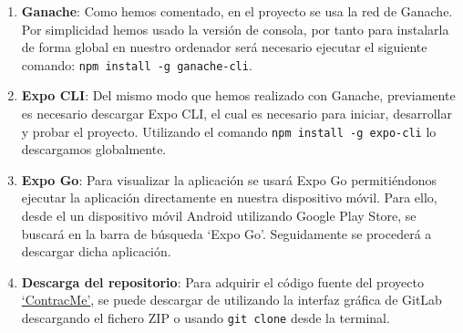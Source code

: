 \begin{enumerate}
\begin{figure}[h]
	\centering
	\texttt{[image: TruffleGanache]}
	\caption[Configuración Ganache Truffle]{Configuración red Ganache en truffle-config.js.}
	\label{fig:TruffleGanache}
\end{figure}

Dentro del archivo \texttt{truffle-config.js} también será necesario realizar la configuración de compiladores para especificar como los contratos inteligentes deben de ser compilados, optimizados y ejecutados en la máquina virtual de Ethereum.
Se deberá especificar la versión \textbf{0.8.20}, la cual usará Truffle para compilar los contratos, esta versión coincide con la versión que se ha usado de Solidity para desarrollar los contratos inteligentes.
Dentro de \textit{Settings} se ha de especificar algunas opciones que afectan a la compilación de los contratos. La opción \textit{optimizer} debe marcarse como \textit{true}, ayudándonos a reducir el código \textit{byte} de los contratos y hacerlos más eficientes en términos de gas.
Por otro lado, las \textit{runs} se deben de establecer en 200, un número más alto puede resultar en un código más optimizado en términos de gas, pero con un proceso de compilación más lento. ver imagen \ref{fig:TruffleCompiler}.

\begin{figure}[h]
	\centering
	\texttt{[image: TruffleCompiler]}
	\caption[Configuración compilador Truffle]{Configuración del compilador en truffle-config.js.}
	\label{fig:TruffleCompiler}
\end{figure}

\item \textbf{Ganache}: Como hemos comentado, en el proyecto se usa la red de Ganache. Por simplicidad hemos usado la versión de consola, por tanto para instalarla de forma global en nuestro ordenador será necesario ejecutar el siguiente comando: \texttt{npm install -g ganache-cli}.

\item \textbf{Expo CLI}: Del mismo modo que hemos realizado con Ganache, previamente es necesario descargar Expo CLI, el cual es necesario para iniciar, desarrollar y probar el proyecto.
Utilizando el comando \texttt{npm install -g expo-cli} lo descargamos globalmente.

\item \textbf{Expo Go}: Para visualizar la aplicación se usará Expo Go permitiéndonos ejecutar la aplicación directamente en nuestra dispositivo móvil.
Para ello, desde el un dispositivo móvil Android utilizando Google Play Store, se buscará en la barra de búsqueda `Expo Go'.  Seguidamente se procederá a descargar dicha aplicación.

\item \textbf{Descarga del repositorio}: Para adquirir el código fuente del proyecto \href{https://gitlab.com/HP-SCDS/Observatorio/2023-2024/contractme/ubu-contractme.git}{`ContracMe'}, se puede descargar de utilizando la interfaz gráfica de GitLab descargando el fichero ZIP o usando \texttt{git clone} desde la terminal.

\end{enumerate}


